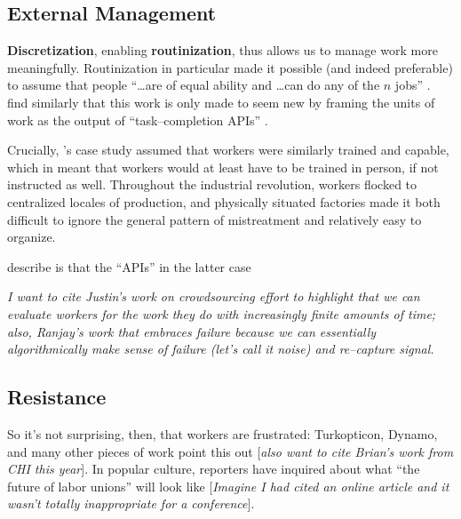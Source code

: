 \documentclass{sigchi}
\begin{document}


\subsection{External Management}
\textbf{Discretization}, enabling \textbf{routinization}, thus allows us to
manage work more meaningfully.
Routinization in particular made it possible
(and indeed preferable) to assume that people
``\dots are of equal ability and \dots can do any of the $n$ jobs''
\cite{hu1961parallel}.
\citeauthor{storiesIraniSilberman}
find similarly that
this work is only made to seem new by framing the units of work as the output of ``task--completion APIs''
\cite{storiesIraniSilberman}.

Crucially,
\citeauthor{hu1961parallel}'s case study assumed that workers were similarly trained and capable,
which in \citeyear{hu1961parallel}
meant that workers would at least have to be trained in person, if not instructed as well.
Throughout the industrial revolution, workers flocked to centralized locales of production,
and physically situated factories made it both
difficult to ignore the general pattern of mistreatment and
relatively easy to organize.

\citeauthor{storiesIraniSilberman} describe is that the ``APIs'' in the latter case



\textit{I want to cite Justin's work on crowdsourcing effort to highlight that
we can evaluate workers for the work they do with increasingly finite amounts of time;
also, Ranjay's work that embraces failure because
we can essentially algorithmically make sense of failure (let's call it noise)
and re--capture signal.}


\subsection{Resistance}
So it's not surprising, then, that workers are frustrated:
Turkopticon, Dynamo, and many other pieces of work point this out
\cite{turkopticon,dynamo,uberAlgorithm}
[\textit{also want to cite Brian's work from CHI this year}].
In popular culture, reporters have inquired about
what ``the future of labor unions'' will look like
[\textit{Imagine I had cited an online article and
it wasn't totally inappropriate for a conference}].
\end{document}
